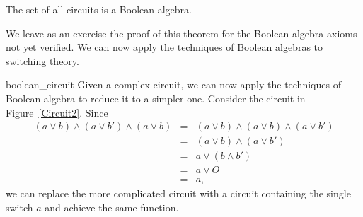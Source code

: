 \begin{theorem}
The set of all circuits is a Boolean algebra.
\end{theorem}
 
 
We leave as an exercise the proof of this theorem for the Boolean
algebra axioms not yet verified. We can now apply the techniques of
Boolean algebras to switching theory. 
 
 

\begin{example}{boolean_circuit}
Given a complex circuit, we can now apply the techniques of
Boolean algebra to reduce it to a simpler one. Consider the circuit in 
Figure~\ref{Circuit2}. Since 
\begin{eqnarray*}
(a \vee b) \wedge (a \vee b') \wedge (a \vee b)
& = &
(a \vee b) \wedge (a \vee b) \wedge (a \vee b') \\
& = &
(a \vee b) \wedge (a \vee b') \\
& = &
a \vee ( b \wedge b') \\
& = &
a \vee O \\
& = &
a,
\end{eqnarray*}
we can replace the more complicated circuit with a circuit containing
the single switch $a$ and achieve the same function.
\end{example}
 
 
 

 
\histhead
 
